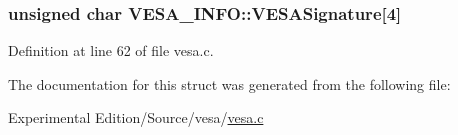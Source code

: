 \subsubsection[{\texorpdfstring{V\+E\+S\+A\+Signature}{VESASignature}}]{\setlength{\rightskip}{0pt plus 5cm}unsigned char V\+E\+S\+A\+\_\+\+I\+N\+F\+O\+::\+V\+E\+S\+A\+Signature\mbox{[}4\mbox{]}}\hypertarget{structVESA__INFO_a29513615169621c4e98f3423197a4af2}{}\label{structVESA__INFO_a29513615169621c4e98f3423197a4af2}


Definition at line 62 of file vesa.\+c.



The documentation for this struct was generated from the following file\+:\begin{DoxyCompactItemize}
\item 
Experimental Edition/\+Source/vesa/\hyperlink{vesa_8c}{vesa.\+c}\end{DoxyCompactItemize}
